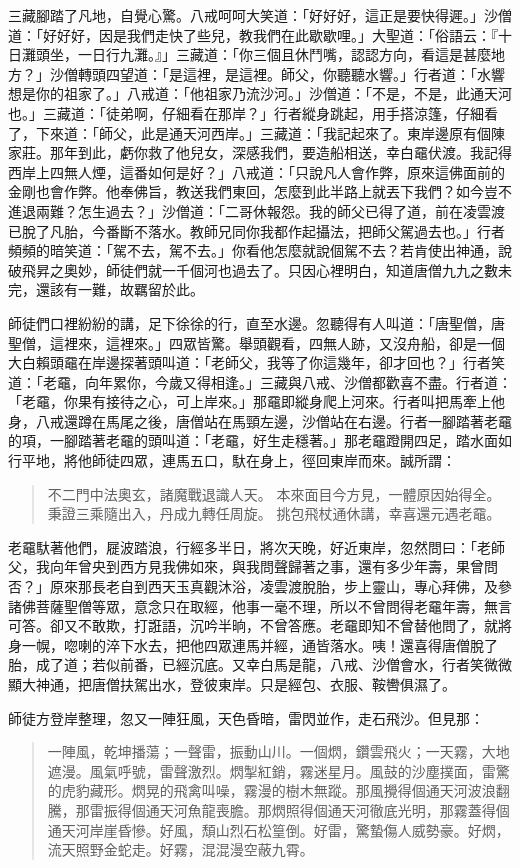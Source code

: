 三藏腳踏了凡地，自覺心驚。八戒呵呵大笑道：「好好好，這正是要快得遲。」沙僧道：「好好好，因是我們走快了些兒，教我們在此歇歇哩。」大聖道：「俗語云：『十日灘頭坐，一日行九灘。』」三藏道：「你三個且休鬥嘴，認認方向，看這是甚麼地方？」沙僧轉頭四望道：「是這裡，是這裡。師父，你聽聽水響。」行者道：「水響想是你的祖家了。」八戒道：「他祖家乃流沙河。」沙僧道：「不是，不是，此通天河也。」三藏道：「徒弟啊，仔細看在那岸？」行者縱身跳起，用手搭涼篷，仔細看了，下來道：「師父，此是通天河西岸。」三藏道：「我記起來了。東岸邊原有個陳家莊。那年到此，虧你救了他兒女，深感我們，要造船相送，幸白黿伏渡。我記得西岸上四無人煙，這番如何是好？」八戒道：「只說凡人會作弊，原來這佛面前的金剛也會作弊。他奉佛旨，教送我們東回，怎麼到此半路上就丟下我們？如今豈不進退兩難？怎生過去？」沙僧道：「二哥休報怨。我的師父已得了道，前在凌雲渡已脫了凡胎，今番斷不落水。教師兄同你我都作起攝法，把師父駕過去也。」行者頻頻的暗笑道：「駕不去，駕不去。」你看他怎麼就說個駕不去？若肯使出神通，說破飛昇之奧妙，師徒們就一千個河也過去了。只因心裡明白，知道唐僧九九之數未完，還該有一難，故羈留於此。

師徒們口裡紛紛的講，足下徐徐的行，直至水邊。忽聽得有人叫道：「唐聖僧，唐聖僧，這裡來，這裡來。」四眾皆驚。舉頭觀看，四無人跡，又沒舟船，卻是一個大白賴頭黿在岸邊探著頭叫道：「老師父，我等了你這幾年，卻才回也？」行者笑道：「老黿，向年累你，今歲又得相逢。」三藏與八戒、沙僧都歡喜不盡。行者道：「老黿，你果有接待之心，可上岸來。」那黿即縱身爬上河來。行者叫把馬牽上他身，八戒還蹲在馬尾之後，唐僧站在馬頸左邊，沙僧站在右邊。行者一腳踏著老黿的項，一腳踏著老黿的頭叫道：「老黿，好生走穩著。」那老黿蹬開四足，踏水面如行平地，將他師徒四眾，連馬五口，馱在身上，徑回東岸而來。誠所謂：
\begin{quote}
不二門中法奧玄，諸魔戰退識人天。
本來面目今方見，一體原因始得全。
秉證三乘隨出入，丹成九轉任周旋。
挑包飛杖通休講，幸喜還元遇老黿。
\end{quote}

老黿馱著他們，屣波踏浪，行經多半日，將次天晚，好近東岸，忽然問曰：「老師父，我向年曾央到西方見我佛如來，與我問聲歸著之事，還有多少年壽，果曾問否？」原來那長老自到西天玉真觀沐浴，凌雲渡脫胎，步上靈山，專心拜佛，及參諸佛菩薩聖僧等眾，意念只在取經，他事一毫不理，所以不曾問得老黿年壽，無言可答。卻又不敢欺，打誑語，沉吟半晌，不曾答應。老黿即知不曾替他問了，就將身一幌，唿喇的淬下水去，把他四眾連馬并經，通皆落水。咦！還喜得唐僧脫了胎，成了道；若似前番，已經沉底。又幸白馬是龍，八戒、沙僧會水，行者笑微微顯大神通，把唐僧扶駕出水，登彼東岸。只是經包、衣服、鞍轡俱濕了。

師徒方登岸整理，忽又一陣狂風，天色昏暗，雷閃並作，走石飛沙。但見那：
\begin{quote}
一陣風，乾坤播蕩；一聲雷，振動山川。一個熌，鑽雲飛火；一天霧，大地遮漫。風氣呼號，雷聲激烈。熌掣紅銷，霧迷星月。風鼓的沙塵撲面，雷驚的虎豹藏形。熌晃的飛禽叫噪，霧漫的樹木無蹤。那風攪得個通天河波浪翻騰，那雷振得個通天河魚龍喪膽。那熌照得個通天河徹底光明，那霧蓋得個通天河岸崖昏慘。好風，頹山烈石松篁倒。好雷，驚蟄傷人威勢豪。好熌，流天照野金蛇走。好霧，混混漫空蔽九霄。
\end{quote}

